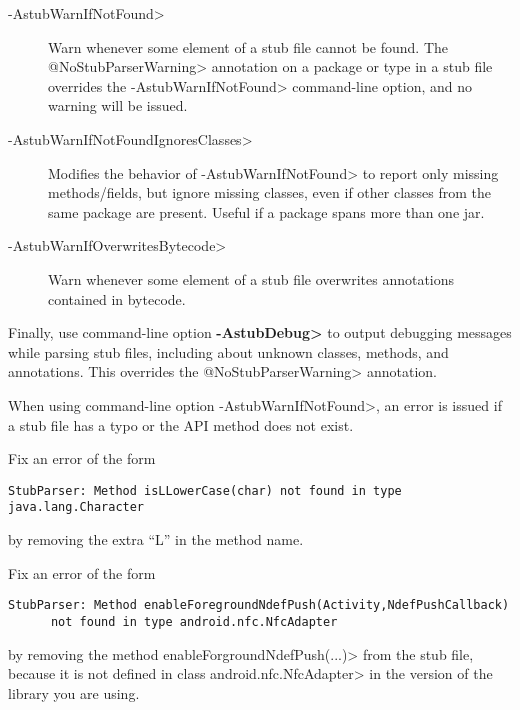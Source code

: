 \begin{description}
\item[\<-AstubWarnIfNotFound>]
  Warn whenever some element of a stub file cannot be found.
  The \<@NoStubParserWarning> annotation on a package or type in a stub file
  overrides the \<-AstubWarnIfNotFound> command-line option, and no warning
  will be issued.

\item[\<-AstubWarnIfNotFoundIgnoresClasses>]
  Modifies the behavior of \<-AstubWarnIfNotFound>
  to report only missing methods/fields, but ignore missing classes, even if
  other classes from the same package are present.
  Useful if a package spans more than one jar.

\item[\<-AstubWarnIfOverwritesBytecode>]
  Warn whenever some element of a
  stub file overwrites annotations contained in bytecode.
\end{description}

Finally,
use command-line option {\bf\<-AstubDebug>} to output debugging messages while
parsing stub files, including about unknown classes, methods, and
annotations.  This overrides the \<@NoStubParserWarning> annotation.




When using command-line option \<-AstubWarnIfNotFound>,
an error is issued if a stub file has a typo or the API method does not
exist.

Fix an error of the form
\begin{Verbatim}
StubParser: Method isLLowerCase(char) not found in type java.lang.Character
\end{Verbatim}

\noindent
by removing the extra ``L'' in the method name.

Fix an error of the form
\begin{Verbatim}
StubParser: Method enableForegroundNdefPush(Activity,NdefPushCallback)
      not found in type android.nfc.NfcAdapter
\end{Verbatim}

\noindent
by removing the method \<enableForgroundNdefPush(...)> from
the stub file, because it is not defined in class \<android.nfc.NfcAdapter>
in the version of the library you are using.



